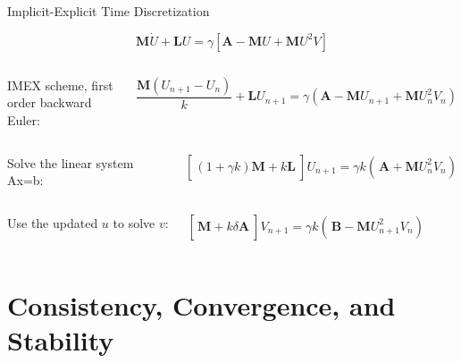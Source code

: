\documentclass{beamer}
\begin{document}
    	\begin{frame}{Implicit-Explicit Time Discretization}
    	
    	\vspace{-1cm}
    	
    	{\Large $$\textbf{M}\dot{U} + \textbf{L}U = \gamma\left[\textbf{A} - \textbf{M}U + \textbf{M}U^2V\right]$$}

    	\vspace{0mm}
    	
    	\begin{columns}
    		
    		IMEX scheme, first order backward Euler:
    		
    		$$ \frac{\textbf{M}(U_{n+1} - U_{n})}{k} + \textbf{L}U_{n+1} = \gamma\left(\textbf{A} - \textbf{M}U_{n+1} + \textbf{M}U_{n}^2V_{n}\right) $$
    		
    	\end{columns}
    \vfill
    	\begin{columns}    		
    		Solve the linear system Ax=b:  
    		  		
    		$$ \left[\frac{}{}(1+\gamma k)\textbf{M} + k \textbf{L}~\right]U_{n+1} = \gamma k\left(\frac{}{}\textbf{A} + \textbf{M}U_{n}^2V_{n}\right) $$
    		
    	\end{columns}
    \vfill
        	\begin{columns}    		
    	Use the updated $u$ to solve $v$: 
    	
    	$$ \left[\frac{}{}\textbf{M} + k\delta \textbf{A}~\right]V_{n+1} = \gamma k\left(\frac{}{}\textbf{B} - \textbf{M}U_{n+1}^2V_{n}\right) $$
    	
    	\end{columns}
    	
    \end{frame}
    
    \section[Error Analysis]{Consistency, Convergence, and Stability}
    
\end{document}

